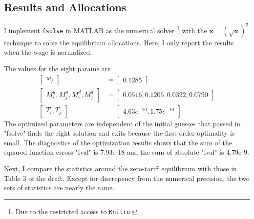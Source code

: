 \documentclass{homeworg}
\begin{document}
\subsection{Results and Allocations}

I implement \lstinline{fsolve} in MATLAB as the numerical solver \footnote{Due to the restricted access to \lstinline{Knitro}.} with the $\boldsymbol{x} = \boldsymbol{(\sqrt{x}) ^ 2}$ technique to solve the equilibrium allocations. Here, I only report the results when the wage is normalized.

The values for the eight params are
\begin{align*}
\begin{bmatrix}
w_j
\end{bmatrix} &= \begin{bmatrix}
0.1285
\end{bmatrix} \\
\begin{bmatrix}
M^{u}_{i}, M^{u}_{j}, M^{d}_{i}, M^{d}_{j}
\end{bmatrix} &= \begin{bmatrix}
0.0516, 0.1205, 0.0322, 0.0790
\end{bmatrix} \\
\begin{bmatrix}
T_{i}, T_{j}
\end{bmatrix} &= \begin{bmatrix}
4.63e^{-10}, 1.75e^{-10}
\end{bmatrix}
\end{align*}
The optimized parameters are independent of the initial guesses that passed in. "fsolve" finds the right solution and exits because the first-order optimality is small. The diagnostics of the optimization results shows that the sum of the squared function errors "fval" is 7.93e-18 and the sum of absolute "fval" is 4.79e-9. 

Next, I compare the statistics around the zero-tariff equilibrium with those in Table 3 of the draft. Except for discrepency from the numerical precision, the two sets of statistics are nearly the same.
\end{document}
